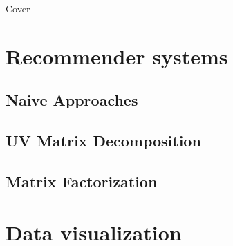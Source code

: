\documentclass[12pt]{article}
\begin{document}
\thispagestyle{empty}
\begin{center}
\Huge    Cover
\end{center}

\newpage
\thispagestyle{empty}
\tableofcontents

\newpage
\section{Recommender systems}
\subsection{Naive Approaches}

\subsection{UV Matrix Decomposition}

\subsection{Matrix Factorization}

\section{Data visualization}
\end{document}

